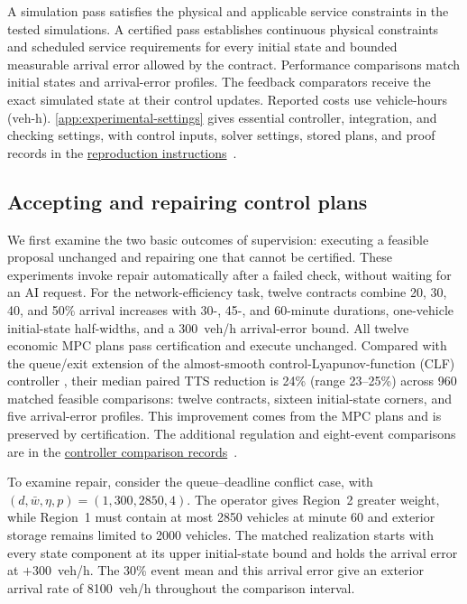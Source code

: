 \documentclass[preprint,12pt]{elsarticle}
\theoremstyle{definition}
\theoremstyle{plain}
\theoremstyle{definition}
\theoremstyle{plain}
\newcommand{\appref}[1]{\ref{#1}}
\newcommand{\reproductiondetails}[1]{\href{https://github.com/AlienEslami/agentic-perimeter-runtime-certification/releases/tag/paper-2026-11-10}{#1}~\cite{perimeterReproductionGuide}}
\begin{document}
A simulation pass satisfies the physical and applicable service
constraints in the tested simulations. A certified pass establishes continuous
physical constraints and scheduled service requirements for every initial
state and bounded measurable arrival error allowed by the contract.
Performance comparisons match initial states and arrival-error profiles.
The feedback comparators receive the exact simulated state at their
control updates.
Reported costs use vehicle-hours (veh-h).
\appref{app:experimental-settings} gives essential controller, integration,
and checking settings, with control inputs, solver settings, stored plans, and
proof records in the \reproductiondetails{reproduction instructions}.


\subsection{Accepting and repairing control plans}
\label{sec:new-incident-protocol}
\label{sec:controller-benchmarks}
\label{sec:new-mpc-results}
\label{sec:repair-results}

We first examine the two basic outcomes of supervision: executing a
feasible proposal unchanged and repairing one that cannot be certified.
These experiments invoke repair automatically after a failed check,
without waiting for an AI request.
For the network-efficiency task, twelve contracts combine 20, 30, 40, and 50\% arrival
increases with 30-, 45-, and 60-minute durations, one-vehicle initial-state
half-widths, and a 300~veh/h arrival-error bound. All twelve economic
MPC plans pass certification and execute unchanged. Compared with the
queue/exit extension of the almost-smooth control-Lyapunov-function (CLF)
controller \cite{geroliminis2013mpc,zhong2018robust}, their median paired
TTS reduction is 24\% (range 23--25\%) across 960 matched feasible
comparisons: twelve contracts, sixteen initial-state corners, and five
arrival-error profiles. This improvement comes from the MPC plans and is preserved by certification.
The additional regulation and eight-event comparisons are in the
\reproductiondetails{controller comparison records}.

To examine repair, consider the queue--deadline conflict case, with
$(d,\bar w,\eta,p)=(1,300,2850,4)$. The operator gives
Region~2 greater weight, while Region~1 must contain at most 2850 vehicles
at minute 60 and exterior storage remains limited to 2000 vehicles.
The matched realization starts with every state component at its upper
initial-state bound and holds the arrival error at $+300$~veh/h.
The 30\% event mean and this arrival error give an exterior arrival rate of
8100~veh/h throughout the comparison interval.
\end{document}
